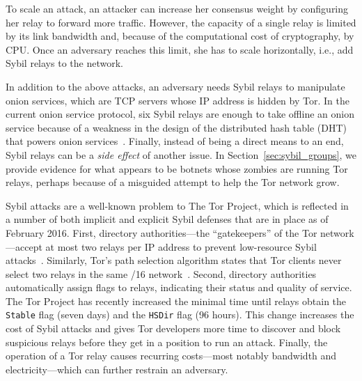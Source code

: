 To scale an attack, an attacker can increase her consensus weight by configuring
her relay to forward more traffic.  However, the capacity of a single relay is
limited by its link bandwidth and, because of the computational cost of
cryptography, by CPU.  Once an adversary reaches this limit, she has to scale
horizontally, i.e., add Sybil relays to the network.

In addition to the above attacks, an adversary needs Sybil relays to manipulate
onion services, which are TCP servers whose IP address is hidden by Tor.  In the
current onion service protocol, six Sybil relays are enough to take offline
an onion service because of a weakness in the design of the distributed hash
table (DHT) that powers onion services~\cite{Biryukov2013a}.  Finally, instead
of being a direct means to an end, Sybil relays can be a \emph{side effect} of
another issue.  In Section~\ref{sec:sybil_groups}, we provide evidence for what
appears to be botnets whose zombies are running Tor relays, perhaps because of a
misguided attempt to help the Tor network grow.

Sybil attacks are a well-known problem to The Tor Project, which is reflected in
a number of both implicit and explicit Sybil defenses that are in place as of
February 2016.  First, directory authorities---the ``gatekeepers'' of the Tor
network---accept at most two relays per IP address to prevent low-resource Sybil
attacks~\cite{Bauer2007a,Bauer2007b}.  Similarly, Tor's path selection algorithm
states that Tor clients never select two relays in the same /16
network~\cite{path-spec}.  Second, directory authorities automatically assign
flags to relays, indicating their status and quality of service.  The Tor
Project has recently increased the minimal time until relays obtain the
\texttt{Stable} flag (seven days) and the \texttt{HSDir} flag (96 hours).  This
change increases the cost of Sybil attacks and gives Tor developers more time to
discover and block suspicious relays before they get in a position to run an
attack.  Finally, the operation of a Tor relay causes recurring costs---most
notably bandwidth and electricity---which can further restrain an adversary.


